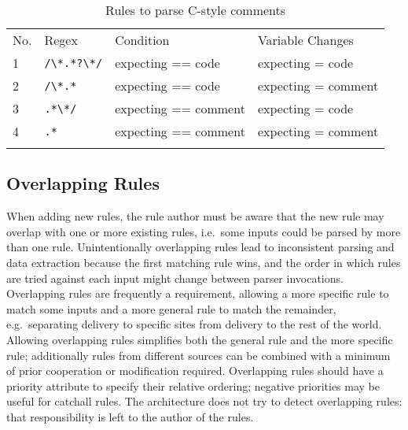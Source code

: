\begin{table}[ht]
    \caption{Rules to parse C-style comments}
    \empty{}\label{Rules to parse C-style comments}
    \begin{tabular}{llll}
        \tabletopline{}%
        No.   & Regex             & Condition             & Variable Changes    \\
        \tablemiddleline{}%
        1     & \verb!/\*.*?\*/!  & expecting == code     & expecting = code      \\
        2     & \verb!/\*.*!      & expecting == code     & expecting = comment   \\
        3     & \verb!.*\*/!      & expecting == comment  & expecting = code      \\
        4     & \verb!.*!         & expecting == comment  & expecting = comment   \\
        \tablebottomline{}%
    \end{tabular}
\end{table}

\subsection{Overlapping Rules}

\label{overlapping rules in architecture}

When adding new rules, the rule author must be aware that the new rule may
overlap with one or more existing rules, i.e.\ some inputs could be parsed
by more than one rule.  Unintentionally overlapping rules lead to
inconsistent parsing and data extraction because the first matching rule
wins, and the order in which rules are tried against each input might
change between parser invocations.  Overlapping rules are frequently a
requirement, allowing a more specific rule to match some inputs and a more
general rule to match the remainder, e.g.\ separating 
delivery to specific sites from  delivery to the rest of the
world.  Allowing overlapping rules simplifies both the general rule and the
more specific rule; additionally rules from different sources can be
combined with a minimum of prior cooperation or modification required.
Overlapping rules should have a priority attribute to specify their
relative ordering; negative priorities may be useful for catchall rules.
The architecture does not try to detect overlapping rules: that
responsibility is left to the author of the rules.

